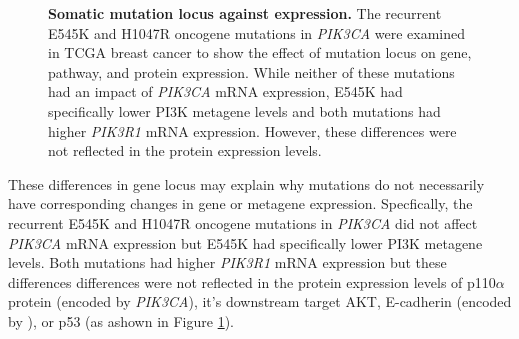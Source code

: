 \begin{figure}[!ht]
\begin{mdframed}
\begin{center}
    \end{center}
    \caption[Somatic mutation locus against expression]{\small \textbf{Somatic mutation locus against expression.} The recurrent E545K and H1047R oncogene mutations in \textit{PIK3CA} were examined in TCGA breast cancer to show the effect of mutation locus on gene, pathway, and protein expression. While neither of these mutations had an impact of \textit{PIK3CA} mRNA expression, E545K had specifically lower PI3K \citep{Gatza2011} metagene levels and both mutations had higher \textit{PIK3R1} mRNA expression. However, these differences were not reflected in the protein expression levels.
}
\label{fig:mutation_expr}
\end{mdframed}
\end{figure}

These differences in gene locus may explain why mutations do not necessarily have corresponding changes in gene or metagene expression. Specfically, the recurrent E545K and H1047R oncogene mutations in \textit{PIK3CA} did not affect \textit{PIK3CA} mRNA expression but E545K had specifically lower PI3K \citep{Gatza2011} metagene levels. Both mutations had higher \textit{PIK3R1} mRNA expression but these differences differences were not reflected in the protein expression levels of p110$\alpha$ protein (encoded by \textit{PIK3CA}), it's downstream target AKT, E-cadherin (encoded by ), or p53 (as ashown in Figure \ref{fig:mutation_expr}).


